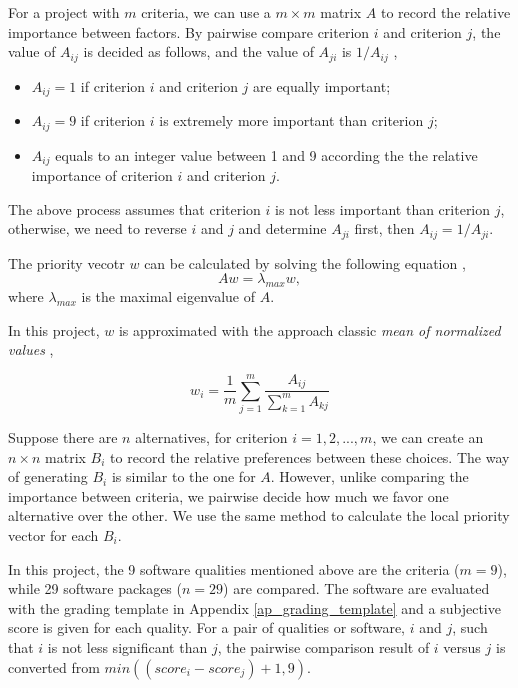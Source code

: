 For a project with $ m $ criteria, we can use a  $m\times m$ matrix $A$ to record the relative importance between factors. By pairwise compare criterion $i$ and criterion $j$, the value of $A_{ij}$ is decided as follows, and the value of $A_{ji}$ is $1/A_{ij}$ \cite{Saaty1990},
\begin{itemize}
\item $A_{ij} = 1$ if criterion $i$ and criterion $j$ are equally important;
\item $A_{ij} = 9$ if criterion $i$ is extremely more important than criterion $j$;
\item $A_{ij}$ equals to an integer value between 1 and 9 according the the relative importance of criterion $i$ and criterion $j$.
\end{itemize}

The above process assumes that criterion $i$ is not less important than criterion $j$, otherwise, we need to reverse $i$ and $j$ and determine $A_{ji}$ first, then $A_{ij} = 1/A_{ji}$.

The priority vecotr $w$ can be calculated by solving the following equation \cite{Saaty1990}, \begin{equation}
Aw = \lambda_{max}w,
\end{equation}
where $\lambda_{max}$ is the maximal eigenvalue of $A$.

In this project, $w$ is approximated with the approach classic \textit{mean of normalized values}  \cite{AlessioEtAl2006},

\begin{equation}
w_i = \frac{1}{m}\sum_{j=1}^{m}\frac{A_{ij}}{\sum_{k=1}^{m}A_{kj}}
\end{equation}

Suppose there are $n$ alternatives, for criterion $i = 1, 2, ... , m$, we can create an $n\times n$ matrix $B_i$ to record the relative preferences between these choices. The way of generating $B_i$ is similar to the one for $A$. However, unlike comparing the importance between criteria, we pairwise decide how much we favor one alternative over the other. We use the same method to calculate the local priority vector for each $B_i$.

In this project, the 9 software qualities mentioned above are the criteria ($m = 9$), while 29 software packages ($n = 29$) are compared. The software are evaluated with the grading template in Appendix \ref{ap_grading_template} and a subjective score is given for each quality. For a pair of qualities or software, $i$ and $j$, such that $i$ is not less significant than $j$, the pairwise comparison result of $i$ versus $j$ is converted from $min((score_i - score_j) + 1, 9)$.
